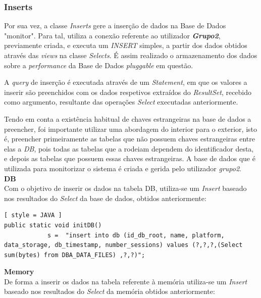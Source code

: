 \documentclass[a4paper]{article}
\begin{document}
\newpage

\subsubsection{Inserts}
\hspace{3mm} 

Por sua vez, a classe \emph{Inserts} gere a inserção de dados na Base de Dados "monitor". Para tal, utiliza a conexão referente ao utilizador \emph{\textbf{Grupo2}}, previamente criada, e executa um \emph{INSERT} simples, a partir dos dados obtidos através das \emph{views} na classe \emph{Selects}. É assim realizado o armazenamento dos dados sobre a \emph{performance} da Base de Dados \emph{pluggable} em questão. 

A \emph{query} de inserção é executada através de um \emph{Statement}, em que os valores a inserir são preenchidos com os dados respetivos extraídos do \emph{ResultSet}, recebido como argumento, resultante das operações \emph{Select} executadas anteriormente.

Tendo em conta a existência habitual de chaves estrangeiras na base de dados a preencher, foi importante utilizar uma abordagem do interior para o exterior, isto é, preencher primeiramente as tabelas que não possuem chaves estrangeiras entre elas a \emph{DB}, pois todas as tabelas que a rodeiam dependem do identificador desta, e depois as tabelas que possuem essas chaves estrangeiras. A base de dados que é utilizada para monitorizar o sistema é criada e gerida pelo utilizador \emph{grupo2}.\\


\textbf{\large DB}\\

Com o objetivo de inserir os dados na tabela DB, utiliza-se um \emph{Insert} baseado nos resultados do \emph{Select} da base de dados, obtidos anteriormente:

\begin{lstlisting}[ style = JAVA ]
public static void initDB() 
            s =  "insert into db (id_db_root, name, platform, data_storage, db_timestamp, number_sessions) values (?,?,?,(Select sum(bytes) from DBA_DATA_FILES) ,?,?)";
\end{lstlisting}


\textbf{\large Memory}\\

De forma a inserir os dados na tabela referente à memória utiliza-se um \emph{Insert} baseado nos resultados do \emph{Select} da memória obtidos anteriormente:
\end{document}
